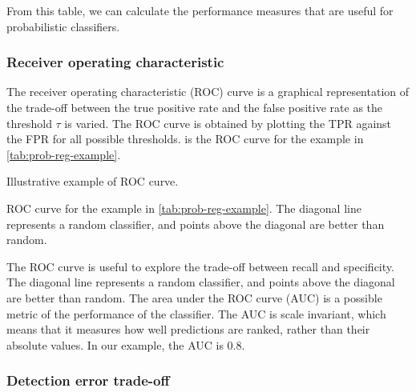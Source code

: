 From this table, we can calculate the performance measures that are useful for
probabilistic classifiers.

\subsubsection{Receiver operating characteristic}

The receiver operating characteristic (ROC) curve is a graphical representation of the
trade-off between the true positive rate and the false positive rate as the threshold
$\tau$ is varied.  The ROC curve is obtained by plotting the TPR against the FPR for all
possible thresholds.   is the ROC curve for the example in
\cref{tab:prob-reg-example}.

\begin{figurebox}[label=fig:roc-example]{Illustrative example of ROC curve.}
  \centering
  \tcblower
  ROC curve for the example in \cref{tab:prob-reg-example}.  The diagonal line represents
  a random classifier, and points above the diagonal are better than random.
\end{figurebox}

The ROC curve is useful to explore the trade-off between recall and specificity.  The
diagonal line represents a random classifier, and points above the diagonal are better
than random.  The area under the ROC curve (AUC) is a possible metric of the performance
of the classifier.  The AUC is scale invariant, which means that it measures how well
predictions are ranked, rather than their absolute values.  In our example, the AUC is
$0.8$.

\subsubsection{Detection error trade-off}

